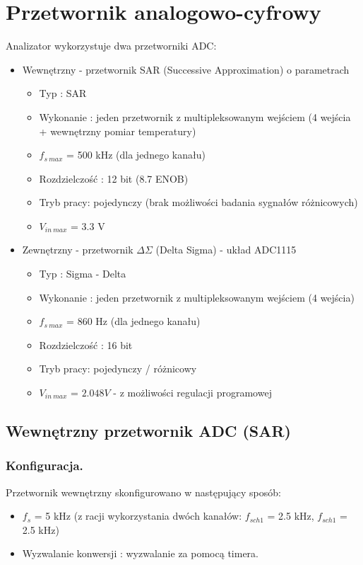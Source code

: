 \section{Przetwornik analogowo-cyfrowy}
Analizator wykorzystuje dwa przetworniki ADC:
\begin{itemize}
    \item Wewnętrzny - przetwornik SAR (Successive Approximation) o parametrach
        \begin{itemize}
            \item Typ : SAR
            \item Wykonanie : jeden przetwornik z multipleksowanym wejściem (4 wejścia + wewnętrzny pomiar temperatury)
            \item $f_{s\ max}$ = 500 kHz (dla jednego kanału)
            \item Rozdzielczość : 12 bit (8.7 ENOB)
            \item Tryb pracy: pojedynczy (brak możliwości badania sygnałów różnicowych) 
            \item $V_{in\ max}$ = 3.3 V
        \end{itemize}
        
    \item Zewnętrzny - przetwornik $\Delta\Sigma$ (Delta Sigma) - układ ADC1115
        \begin{itemize}
            \item Typ : Sigma - Delta
            \item Wykonanie : jeden przetwornik z multipleksowanym wejściem (4 wejścia) 
            \item $f_{s\ max}$ = 860 Hz (dla jednego kanału)
            \item Rozdzielczość : 16 bit 
            \item Tryb pracy: pojedynczy / różnicowy
            \item $V_{in\ max}$ = $2.048V$ - z możliwości regulacji programowej
        \end{itemize}
\end{itemize}

\subsection{Wewnętrzny przetwornik ADC (SAR)}
\subsubsection{Konfiguracja.}
Przetwornik wewnętrzny skonfigurowano w następujący sposób:
    \begin{itemize}
        \item $f_{s}$ = 5 kHz (z racji wykorzystania dwóch kanałów: $f_{sch1}$ = 2.5 kHz, $f_{sch1}$ = 2.5 kHz)
        \item Wyzwalanie konwersji : wyzwalanie za pomocą timera. 
    \end{itemize}

